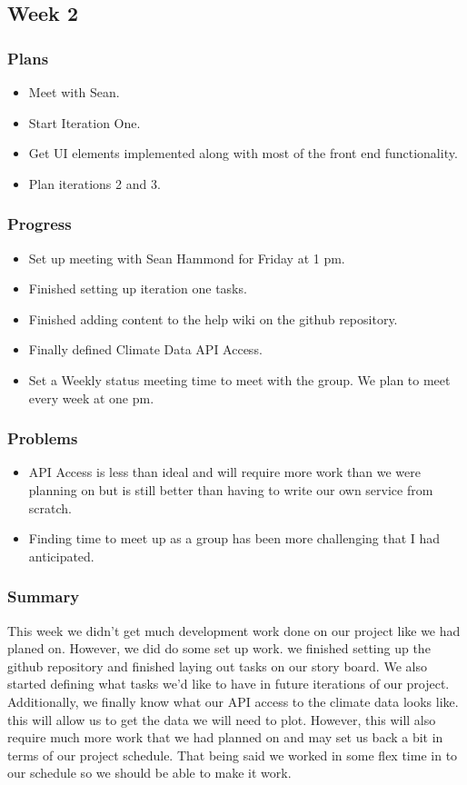 \documentclass[onecolumn, draftclsnofoot,10pt, compsoc]{article}
\begin{document}
		\subsection{Week 2}
			\subsubsection{Plans}
				\begin{itemize}
					\item Meet with Sean.
					\item Start Iteration One.
					\item Get UI elements implemented along with most of the front end functionality.
					\item Plan iterations 2 and 3.
				\end{itemize}
			\subsubsection{Progress}
				\begin{itemize}
					\item Set up meeting with Sean Hammond for Friday at 1 pm.
					\item Finished setting up iteration one tasks.
					\item Finished adding content to the help wiki on the github repository.
					\item Finally defined Climate Data API Access.
					\item Set a Weekly status meeting time to meet with the group. We plan to meet every week at one pm.
				\end{itemize}
			\subsubsection{Problems}
				\begin{itemize}
					\item API Access is less than ideal and will require more work than we were planning on but is still better than having to write our own service from scratch.
					\item Finding time to meet up as a group has been more challenging that I had anticipated.
				\end{itemize}

			\subsubsection{Summary}
			This week we didn't get much development work done on our project like we had planed on. However, we did do some set up work. we finished setting up the github repository and finished laying out tasks on our story board. We also started defining what tasks we'd like to have in future iterations of our project. Additionally, we finally know what our API access to the climate data looks like. this will allow us to get the data we will need to plot. However, this will also require much more work that we had planned on and may set us back a bit in terms of our project schedule. That being said we worked in some flex time in to our schedule so we should be able to make it work.\\
\end{document}
